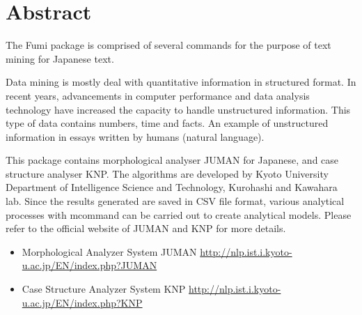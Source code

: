 
\section{Abstract}
The Fumi package is comprised of several commands for the purpose of text mining for Japanese text. 

Data mining is mostly deal with quantitative information in structured format. 
In recent years, advancements in computer performance and data analysis technology have increased the capacity to handle unstructured information. This type of data contains numbers, time and facts. An example of unstructured information in essays written by humans (natural language). 

This package contains morphological analyser JUMAN for Japanese, and case structure analyser KNP. The algorithms are developed by Kyoto University Department of Intelligence Science and Technology, Kurohashi and Kawahara lab. 
Since the results generated are saved in CSV file format, various analytical processes with mcommand can be carried out to create analytical models. 
Please refer to the official website of JUMAN and KNP for more details. 

\begin{itemize}
\item Morphological Analyzer System  JUMAN \url{http://nlp.ist.i.kyoto-u.ac.jp/EN/index.php?JUMAN}
\item Case Structure Analyzer System KNP \url{http://nlp.ist.i.kyoto-u.ac.jp/EN/index.php?KNP}
\end{itemize}

 




